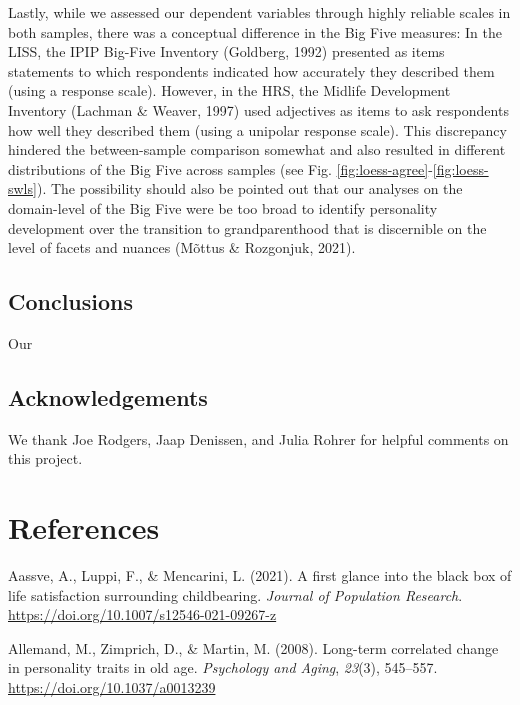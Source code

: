 \documentclass[
  english,
  man, noextraspace]{apa7}
\begin{document}
Lastly, while we assessed our dependent variables through highly reliable scales in both samples, there was a conceptual difference in the Big Five measures: In the LISS, the IPIP Big-Five Inventory (Goldberg, 1992) presented as items statements to which respondents indicated how accurately they described them (using a response scale). However, in the HRS, the Midlife Development Inventory (Lachman \& Weaver, 1997) used adjectives as items to ask respondents how well they described them (using a unipolar response scale). This discrepancy hindered the between-sample comparison somewhat and also resulted in different distributions of the Big Five across samples (see Fig. \ref{fig:loess-agree}-\ref{fig:loess-swls}). The possibility should also be pointed out that our analyses on the domain-level of the Big Five were be too broad to identify personality development over the transition to grandparenthood that is discernible on the level of facets and nuances (Mõttus \& Rozgonjuk, 2021).

\hypertarget{conclusions}{%
\subsection{Conclusions}\label{conclusions}}

Our

\hypertarget{acknowledgements}{%
\subsection{Acknowledgements}\label{acknowledgements}}

We thank Joe Rodgers, Jaap Denissen, and Julia Rohrer for helpful comments on this project.

\newpage

\hypertarget{references}{%
\section{References}\label{references}}

\begingroup
\setlength{\parindent}{-0.5in}
\setlength{\leftskip}{0.5in}

\hypertarget{refs}{}
\leavevmode\hypertarget{ref-aassveFirstGlanceBlack2021}{}%
Aassve, A., Luppi, F., \& Mencarini, L. (2021). A first glance into the black box of life satisfaction surrounding childbearing. \emph{Journal of Population Research}. \url{https://doi.org/10.1007/s12546-021-09267-z}

\leavevmode\hypertarget{ref-allemandLongtermCorrelatedChange2008a}{}%
Allemand, M., Zimprich, D., \& Martin, M. (2008). Long-term correlated change in personality traits in old age. \emph{Psychology and Aging}, \emph{23}(3), 545--557. \url{https://doi.org/10.1037/a0013239}
\end{document}
